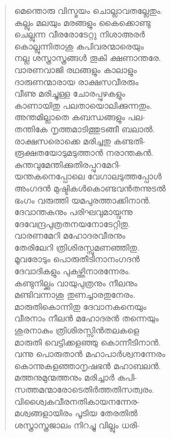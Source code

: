 \begin{verse}
മെന്തൊരു വിസ്മയം ചൊല്ലാവതല്ലേതും.\\
കല്ലും മലയും മരങ്ങളും കൈക്കൊണ്ടു\\
ചെല്ലുന്ന വീരരോടേറ്റു നിശാഅരര്‍\\
കൊല്ലുന്നിതാശു കപിവരന്മാരെയും\\
നല്ല ശസ്ത്രാസ്ത്രങ്ങള്‍ തൂകി ക്ഷണാന്തരേ.\\
വാരണവാജി രഥങ്ങളും കാലാളും\\
ദാരുണന്മാരായ രാക്ഷസവീരരും\\
വീണു മരിച്ചുള്ള ചോരപ്പുഴകളും\\
കാണായിതു പലതായൊലിക്കുന്നതും.\\
അന്തമില്ലാതെ കബന്ധങ്ങളും പല-\\
തന്തികേ നൃത്തമാടിത്തുടങ്ങീ ബലാല്‍.\\
രാക്ഷസരൊക്കെ മരിച്ചതു കണ്ടതി-\\
രൂക്ഷതയോടുമടുത്താന്‍ നരാന്തകന്‍.\\
കുന്തവുമേന്തിക്കുതിരപ്പുറമേറി-\\
യന്തകനെപ്പോലെ വേഗാലടുത്തപ്പോള്‍\\
അംഗദന്‍ മുഷ്ടികള്‍കൊണ്ടവന്‍തന്നുടല്‍\\
ഭംഗം വരുത്തി യമപുരത്താക്കിനാന്‍.\\
ദേവാന്തകനും പരിഘവുമായ്വന്നു\\
ദേവേന്ദ്രപുത്രതനയനോടേറ്റിതു.\\
വാരണമേറി മഹോദരവീരനും\\
തേരിലേറി ത്രിശിരസ്സുമണഞ്ഞിതു.\\
മൂവരോടും പൊരുതീടിനാനംഗദന്‍\\
ദേവാദികളും പുകഴ്ത്തിനാരന്നേരം.\\
കണ്ടുനില്ക്കും വായുപുത്രനും നീലനും\\
മണ്ടിവന്നാശു തുണച്ചാരതുനേരം.\\
മാരുതികൊന്നിതു ദേവാനകനെയും\\
വീരനാം നീലന്‍ മഹോദരന്‍ തന്നെയും\\
ശുരനാകും ത്രിശിരസ്സിന്‍തലകളെ\\
മാരുതി വെട്ടിക്കളഞ്ഞു കൊന്നീടിനാന്‍.\\
വന്നു പൊരുതാന്‍ മഹാപാര്‍ശ്വനന്നേരം\\
കൊന്നുകളഞ്ഞാനൃഷഭന്‍ മഹാബലന്‍.\\
മത്തനുമുന്മത്തനും മരിച്ചാര്‍ കപി-\\
സത്തമന്മാരോടെതിര്‍ത്തതിസത്വരം.\\
വിശ്വൈകവീരനതികായനന്നേര-\\
മശ്വങ്ങളായിരം പൂടിയ തേരതില്‍\\
ശസ്ത്രാസ്ത്രജാലം നിറച്ചു വില്ലും ധരി-\\

\end{verse}
